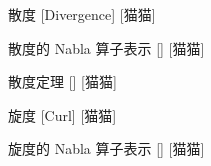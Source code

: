 \documentclass[UTF8]{ctexart}
\begin{document}
			\begin{dfn}
				[]
				{散度}
				[Divergence]
				[猫猫]
			\end{dfn}
			
			\begin{ppt}
				[]
				{散度的 Nabla 算子表示}
				[]
				[猫猫]
			\end{ppt}
			
			\begin{thm}
				[]
				{散度定理}
				[]
				[猫猫]
			\end{thm}
			
			\begin{dfn}
				[]
				{旋度}
				[Curl]
				[猫猫]
			\end{dfn}
			
			\begin{ppt}
				[]
				{旋度的 Nabla 算子表示}
				[]
				[猫猫]
			\end{ppt}
\end{document}

